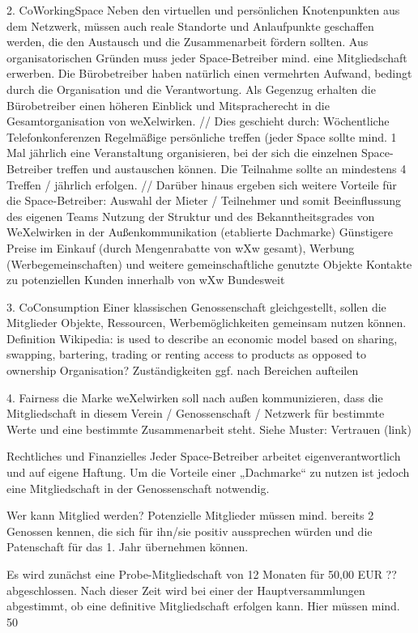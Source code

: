 2. CoWorkingSpace
Neben den virtuellen und persönlichen Knotenpunkten aus dem Netzwerk, müssen auch reale Standorte und Anlaufpunkte geschaffen werden, die den Austausch und die Zusammenarbeit fördern sollten.
Aus organisatorischen Gründen muss jeder Space-Betreiber mind. eine Mitgliedschaft erwerben.
Die Bürobetreiber haben natürlich einen vermehrten Aufwand, bedingt durch die Organisation und die Verantwortung. Als Gegenzug erhalten die Bürobetreiber einen höheren Einblick und Mitspracherecht in die Gesamtorganisation von weXelwirken.
//
Dies geschieht durch:
Wöchentliche Telefonkonferenzen
Regelmäßige persönliche treffen (jeder Space sollte mind. 1 Mal jährlich eine Veranstaltung organisieren, bei der sich die einzelnen Space-Betreiber treffen und austauschen können. Die Teilnahme sollte an mindestens 4 Treffen / jährlich erfolgen.
//
Darüber hinaus ergeben sich weitere Vorteile für die Space-Betreiber: 
Auswahl der Mieter / Teilnehmer und somit Beeinflussung des eigenen Teams
Nutzung der Struktur und des Bekanntheitsgrades von WeXelwirken in der Außenkommunikation (etablierte Dachmarke)
Günstigere Preise im Einkauf (durch Mengenrabatte von wXw gesamt), Werbung (Werbegemeinschaften) und weitere gemeinschaftliche genutzte Objekte
Kontakte zu potenziellen Kunden innerhalb von wXw Bundesweit



3. CoConsumption
Einer klassischen Genossenschaft gleichgestellt, sollen die Mitglieder Objekte, Ressourcen, Werbemöglichkeiten gemeinsam nutzen können.
Definition Wikipedia:
is used to describe an economic model based on sharing, swapping, bartering, trading or renting access to products as opposed to ownership
Organisation?
Zuständigkeiten ggf. nach Bereichen aufteilen

4. Fairness
die Marke weXelwirken soll nach außen kommunizieren, dass die Mitgliedschaft in diesem Verein / Genossenschaft / Netzwerk für bestimmte Werte und eine bestimmte Zusammenarbeit steht. 
Siehe Muster: Vertrauen (link)

Rechtliches und Finanzielles
Jeder Space-Betreiber arbeitet eigenverantwortlich und auf eigene Haftung. 
Um die Vorteile einer „Dachmarke“ zu nutzen ist jedoch eine Mitgliedschaft in der Genossenschaft notwendig.

Wer kann Mitglied werden?
Potenzielle Mitglieder müssen mind. bereits 2 Genossen kennen, die sich für ihn/sie positiv aussprechen würden und die Patenschaft für das 1. Jahr übernehmen können.

Es wird zunächst eine Probe-Mitgliedschaft von 12 Monaten für 50,00 EUR ?? abgeschlossen. Nach dieser Zeit wird bei einer der Hauptversammlungen abgestimmt, ob eine definitive Mitgliedschaft erfolgen kann. Hier müssen mind. 50%

